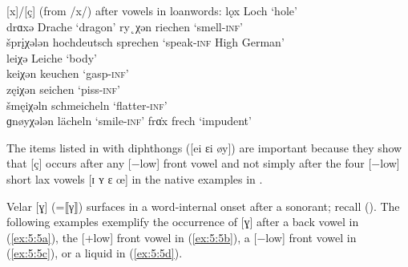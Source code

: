 \ea%
    \label{ex:5:4}
    [x]/[ç] (from /x/) after vowels in loanwords:
\ea\label{ex:5:4a} lǫx   \tab [lɔx]    \tab Loch   \tab  ‘hole’  \\
    drɑxə \tab  [drɑxə] \tab Drache \tab ‘dragon’ 
\ex\label{ex:5:4b} ry˛χən \tab  [rʏçən] \tab riechen \tab ‘smell-\textsc{inf}’ \\
    špr\k{i}χələn  \tab [ʃprɪçələn] \tab hochdeutsch sprechen \tab\tab\tab\tab ‘speak\textsc{{}-inf} High German’ \\
    leiχə      \tab [leiçə]     \tab Leiche               \tab ‘body’                             \\
    keiχən     \tab [keiçən]    \tab keuchen              \tab ‘gasp-\textsc{inf}’                \\
    zęiχən     \tab [zɛiçən]    \tab seichen              \tab ‘piss-\textsc{inf}’                \\
    šmęiχəln   \tab [ʃmɛiçəln]  \tab schmeicheln     \tab       ‘flatter-\textsc{inf}’             \\
    ɡnøyχələn  \tab [gnøyçələn] \tab lächeln              \tab ‘smile\textsc{{}-inf}’             
\ex\label{ex:5:4c} frɑ̇x             \tab [fræx]      \tab frech                \tab ‘impudent’                         
\z
\z 

The items listed in  with diphthongs ([ei ɛi øy]) are important because they show that [ç] occurs after any [−low] front vowel and not simply after the four [−low] short lax vowels [ɪ ʏ ɛ œ] in the native examples in .

  Velar [ɣ] (=⟦γ⟧) surfaces in a word-internal onset after a sonorant; recall  (). The following examples exemplify the occurrence of [ɣ] after a back vowel in (\ref{ex:5:5a}), the [+low] front vowel in (\ref{ex:5:5b}), a [−low] front vowel in (\ref{ex:5:5c}), or a liquid in (\ref{ex:5:5d}).

